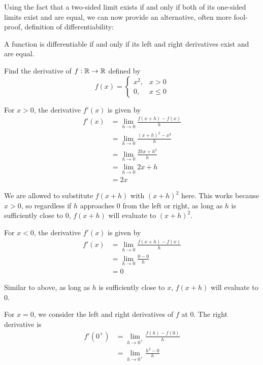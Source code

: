 Using the fact that a two-sided limit exists if and only if both of its one-sided limits exist and are equal, we can now provide an alternative, often more fool-proof, definition of differentiability:
\begin{definition}
  A function is differentiable if and only if its left and right derivatives exist and are equal.
\end{definition}
\begin{eg}
  Find the derivative of $f: \mathbb{R} \to \mathbb{R}$ defined by
  \[
    f(x) =
    \begin{cases}
      x ^ 2, & x > 0 \\ 
      0, & x \leq 0
    \end{cases}
  \]
\end{eg}
\begin{solution}
  For $x > 0$, the derivative $f'(x)$ is given by
  \begin{align*}
    f'(x) &= \lim_{h \to 0} \frac{f(x + h) - f(x)}{h} \\ 
    &= \lim_{h \to 0} \frac{(x + h) ^ 2 - x ^ 2}{h} \\ 
    &= \lim_{h \to 0} \frac{2hx + h ^ 2}{h} \\ 
    &= \lim_{h \to 0} 2x + h \\
    &= 2x
  \end{align*}
  \begin{remark}
    We are allowed to substitute $f(x + h)$ with $(x + h) ^ 2$ here. This works because $x > 0$, so regardless if $h$ approaches 0 from the left or right, as long as $h$ is sufficiently close to 0, $f(x + h)$ will evaluate to $(x + h) ^ 2$.
  \end{remark}
  For $x < 0$, the derivative $f'(x)$ is given by
  \begin{align*}
    f'(x) &= \lim_{h \to 0} \frac{f(x + h) - f(x)}{h} \\ 
    &= \lim_{h \to 0} \frac{0 - 0}{h} \\ 
    &= 0
  \end{align*}
  \begin{remark}
    Similar to above, as long as $h$ is sufficiently close to $x$, $f(x + h)$ will evaluate to 0.
  \end{remark}
  For $x = 0$, we consider the left and right derivatives of $f$ at 0. The right derivative is 
  \begin{align*}
    f'(0 ^ +) &= \lim_{h \to 0 ^ +} \frac{f(h) - f(0)}{h} \\
    &= \lim_{h \to 0 ^ +} \frac{h ^ 2 - 0}{h} \\ 

\end{align*}
\end{solution}
